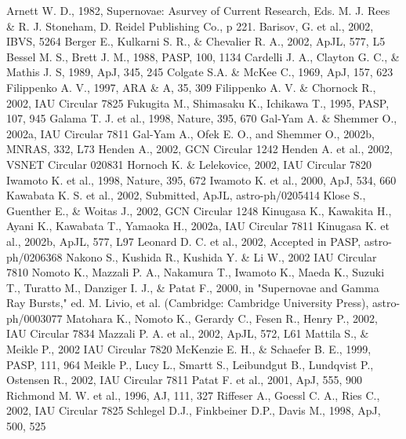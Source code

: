 \begin{thebibliography}{99}
 Arnett W. D., 1982, Supernovae: Asurvey of Current Research, Eds. M. J. Rees \& R. J. Stoneham, D. Reidel Publishing Co., p 221.
 Barisov, G. et al., 2002, IBVS, 5264
 Berger E., Kulkarni S. R., \& Chevalier R. A., 2002, ApJL, 577, L5
 Bessel M. S., Brett J. M., 1988, PASP, 100, 1134
 Cardelli J. A., Clayton G. C., \& Mathis J. S, 1989, ApJ, 345, 245 
 Colgate S.A. \& McKee C., 1969, ApJ, 157, 623
 Filippenko A. V., 1997, ARA \& A, 35, 309
 Filippenko A. V. \& Chornock R., 2002, IAU Circular 7825
 Fukugita M., Shimasaku K., Ichikawa T., 1995, PASP, 107, 945
 Galama T. J. et al., 1998, Nature, 395, 670
 Gal-Yam A. \& Shemmer O., 2002a, IAU Circular 7811 
 Gal-Yam A., Ofek E. O., and Shemmer O., 2002b, MNRAS, 332, L73
 Henden A., 2002, GCN Circular 1242  
 Henden A. et al., 2002, VSNET Circular 020831  
 Hornoch K. \& Lelekovice, 2002, IAU Circular 7820
 Iwamoto K. et al., 1998, Nature, 395, 672
 Iwamoto K. et al., 2000, ApJ, 534, 660
 Kawabata K. S. et al., 2002, Submitted, ApJL, astro-ph/0205414
 Klose S., Guenther E., \& Woitas J., 2002, GCN Circular 1248
 Kinugasa K., Kawakita H., Ayani K., Kawabata T., Yamaoka H., 2002a, IAU Circular 7811
 Kinugasa K. et al., 2002b, ApJL, 577, L97 
 Leonard D. C. et al., 2002, Accepted in PASP, astro-ph/0206368
 Nakono S., Kushida R., Kushida Y. \&  Li W., 2002 IAU Circular 7810
 Nomoto K., Mazzali P. A., Nakamura T., Iwamoto K., Maeda K., Suzuki T., Turatto M., Danziger I. J., \& Patat F., 2000, in "Supernovae and Gamma Ray Bursts," ed. M. Livio, et al. (Cambridge: Cambridge University Press), astro-ph/0003077
 Matohara K., Nomoto K., Gerardy C., Fesen R., Henry P., 2002, IAU Circular 7834
 Mazzali P. A. et al., 2002, ApJL, 572, L61
 Mattila S., \& Meikle P., 2002 IAU Circular 7820
 McKenzie  E. H., \& Schaefer B. E., 1999, PASP, 111, 964
 Meikle P., Lucy L., Smartt S., Leibundgut B., Lundqvist P., Ostensen R., 2002, IAU Circular 7811
 Patat F. et al., 2001, ApJ, 555, 900
 Richmond M. W. et al., 1996, AJ, 111, 327
 Riffeser A., Goessl C. A., Ries C., 2002, IAU Circular 7825 
 Schlegel D.J., Finkbeiner D.P., Davis M., 1998, ApJ, 500, 525

\end{thebibliography}
